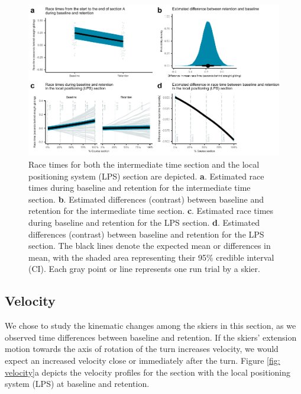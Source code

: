 \documentclass{article}
\begin{document}
\begin{figure}[H]
\centering
\includegraphics{figurer/figure_racetime_2.pdf}
\caption{Race times for both the intermediate time section and the local positioning system (LPS) section are depicted. \textbf{a}. Estimated race times during baseline and retention for the intermediate time section. \textbf{b}. Estimated differences (contrast) between baseline and retention for the intermediate time section. \textbf{c}. Estimated race times during baseline and retention for the LPS section. \textbf{d}. Estimated differences (contrast) between baseline and retention for the LPS section. The black lines denote the expected mean or differences in mean, with the shaded area representing their 95\% credible interval (CI). Each gray point or line represents one run trial by a skier.}\label{fig: racetimes}
\end{figure}

\subsection{Velocity}
We chose to study the kinematic changes among the skiers in this section, as we observed time differences between baseline and retention. If the skiers' extension motion towards the axis of rotation of the turn increases velocity, we would expect an increased velocity close or immediately after the turn. Figure \ref{fig: velocity}a depicts the velocity profiles for the section with the local positioning system (LPS) at baseline and retention.  
\end{document}
